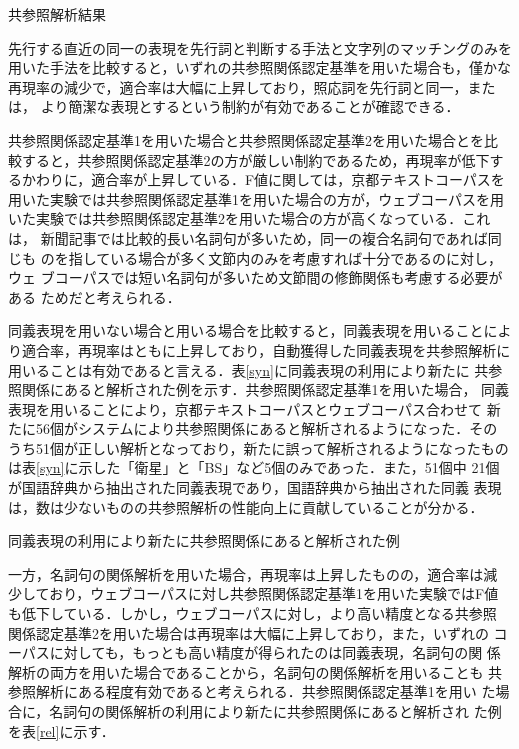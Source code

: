 \documentclass[japanese]{jnlp_1.4}
\begin{document}
  \begin{table}[b]
  \caption{共参照解析結果}
  \label{main}
  \begin{center}

  \end{center}
 \end{table}     

 先行する直近の同一の表現を先行詞と判断する手法と文字列のマッチングのみを
 用いた手法を比較すると，いずれの共参照関係認定基準を用いた場合も，僅かな
 再現率の減少で，適合率は大幅に上昇しており，照応詞を先行詞と同一，または，
 より簡潔な表現とするという制約が有効であることが確認できる．

 共参照関係認定基準1を用いた場合と共参照関係認定基準2を用いた場合とを比
 較すると，共参照関係認定基準2の方が厳しい制約であるため，再現率が低下す
 るかわりに，適合率が上昇している．F値に関しては，京都テキストコーパスを
 用いた実験では共参照関係認定基準1を用いた場合の方が，ウェブコーパスを用
 いた実験では共参照関係認定基準2を用いた場合の方が高くなっている．これは，
 新聞記事では比較的長い名詞句が多いため，同一の複合名詞句であれば同じも
 のを指している場合が多く文節内のみを考慮すれば十分であるのに対し，ウェ
 ブコーパスでは短い名詞句が多いため文節間の修飾関係も考慮する必要がある
 ためだと考えられる．

 同義表現を用いない場合と用いる場合を比較すると，同義表現を用いることによ
 り適合率，再現率はともに上昇しており，自動獲得した同義表現を共参照解析に
 用いることは有効であると言える．表\ref{syn}に同義表現の利用により新たに
 共参照関係にあると解析された例を示す．共参照関係認定基準1を用いた場合，
 同義表現を用いることにより，京都テキストコーパスとウェブコーパス合わせて
 新たに56個がシステムにより共参照関係にあると解析されるようになった．その
 うち51個が正しい解析となっており，新たに誤って解析されるようになったもの
 は表\ref{syn}に示した「衛星」と「BS」など5個のみであった．また，51個中
 21個が国語辞典から抽出された同義表現であり，国語辞典から抽出された同義
 表現は，数は少ないものの共参照解析の性能向上に貢献していることが分かる．

  \begin{table}[b]
   \caption{同義表現の利用により新たに共参照関係にあると解析された例}
   \label{syn}

  \end{table}

  一方，名詞句の関係解析を用いた場合，再現率は上昇したものの，適合率は減
  少しており，ウェブコーパスに対し共参照関係認定基準1を用いた実験ではF値
  も低下している．しかし，ウェブコーパスに対し，より高い精度となる共参照
  関係認定基準2を用いた場合は再現率は大幅に上昇しており，また，いずれの
  コーパスに対しても，もっとも高い精度が得られたのは同義表現，名詞句の関
  係解析の両方を用いた場合であることから，名詞句の関係解析を用いることも
  共参照解析にある程度有効であると考えられる．共参照関係認定基準1を用い
  た場合に，名詞句の関係解析の利用により新たに共参照関係にあると解析され
  た例を表\ref{rel}に示す．
\end{document}
